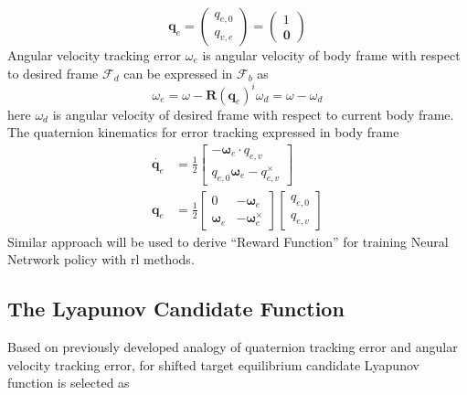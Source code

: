 \begin{equation}
\mathbf{q}_{e} =\begin{pmatrix}
q_{e,0}\\
q_{v,e}
\end{pmatrix} =\begin{pmatrix}
1\\
\mathbf{0}
\end{pmatrix}
\end{equation}Angular velocity tracking error $\displaystyle \omega _{e}$ is angular velocity of body frame with respect to desired frame $\displaystyle \mathcal{F}_{d}$ can be expressed in $\displaystyle \mathcal{F}_{b}$ as 
\label{eqn:qe_zero}
\begin{equation*}
\omega _{e} =\omega -\mathbf{R} (\mathbf{q}_{e} )^{i} \omega _{d} =\omega -\omega _{d}
\end{equation*}
here $\displaystyle \omega _{d}$ is angular velocity of desired frame with respect to current body frame. The quaternion kinematics for error tracking expressed in body frame
\begin{equation}
\begin{aligned}
\dot{\mathbf{q}_{e}} & =\frac{1}{2}\begin{bmatrix}
-\mathbf{\omega }_{e} \cdot q_{e,v}\\
q_{e,0}\mathbf{\omega }_{e} -q^{\times }_{e,v}
\end{bmatrix}\\
\mathbf{q}_{e} & =\frac{1}{2}\begin{bmatrix}
0 & -\mathbf{\omega }_{e}\\
\mathbf{\omega }_{e} & -\mathbf{\omega }^{\times }_{e}
\end{bmatrix}\begin{bmatrix}
q_{e,0}\\
q_{e,v}
\end{bmatrix}
\end{aligned}
\end{equation}
Similar approach will be used to derive ``Reward Function'' for training Neural Netrwork policy with \acrfull{rl} methods.
\subsection{The Lyapunov Candidate Function}
Based on previously developed analogy of quaternion tracking error and angular velocity tracking error, for shifted target equilibrium candidate Lyapunov function is selected as \cite{Wie1989}

